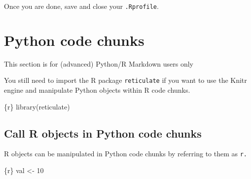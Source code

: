 \documentclass[
  letterpaper,
  DIV=11,
  numbers=noendperiod,
  oneside]{scrreprt}
\newenvironment{Shaded}{\begin{snugshade}}{\end{snugshade}}
\newcommand{\DecValTok}[1]{\textcolor[rgb]{0.68,0.00,0.00}{#1}}
\newcommand{\FunctionTok}[1]{\textcolor[rgb]{0.28,0.35,0.67}{#1}}
\newcommand{\InformationTok}[1]{\textcolor[rgb]{0.37,0.37,0.37}{#1}}
\newcommand{\NormalTok}[1]{\textcolor[rgb]{0.00,0.23,0.31}{#1}}
\newcommand{\OtherTok}[1]{\textcolor[rgb]{0.00,0.23,0.31}{#1}}
\begin{document}
Once you are done, save and close your \texttt{.Rprofile}.

\hypertarget{python-code-chunks}{%
\section{Python code chunks}\label{python-code-chunks}}

\begin{tcolorbox}[enhanced jigsaw, coltitle=black, opacityback=0, title=\textcolor{quarto-callout-warning-color}{\faExclamationTriangle}\hspace{0.5em}{Warning}, toprule=.15mm, bottomtitle=1mm, colbacktitle=quarto-callout-warning-color!10!white, colframe=quarto-callout-warning-color-frame, left=2mm, opacitybacktitle=0.6, bottomrule=.15mm, arc=.35mm, toptitle=1mm, colback=white, titlerule=0mm, breakable, leftrule=.75mm, rightrule=.15mm]

This section is for (advanced) Python/R Markdown users only

\end{tcolorbox}

You still need to import the R package \texttt{reticulate} if you want
to use the Knitr engine and manipulate Python objects within R code
chunks.

\begin{Shaded}
\begin{Highlighting}[]
\InformationTok{\textasciigrave{}\textasciigrave{}\textasciigrave{}\{r\}}
\FunctionTok{library}\NormalTok{(reticulate)}
\InformationTok{\textasciigrave{}\textasciigrave{}\textasciigrave{}}
\end{Highlighting}
\end{Shaded}

\hypertarget{call-r-objects-in-python-code-chunks}{%
\subsection{Call R objects in Python code
chunks}\label{call-r-objects-in-python-code-chunks}}

R objects can be manipulated in Python code chunks by referring to them
as \texttt{r.}

\begin{Shaded}
\begin{Highlighting}[]
\InformationTok{\textasciigrave{}\textasciigrave{}\textasciigrave{}\{r\}}
\NormalTok{val }\OtherTok{\textless{}{-}} \DecValTok{10}
\InformationTok{\textasciigrave{}\textasciigrave{}\textasciigrave{}}
\end{Highlighting}
\end{Shaded}
\end{document}
